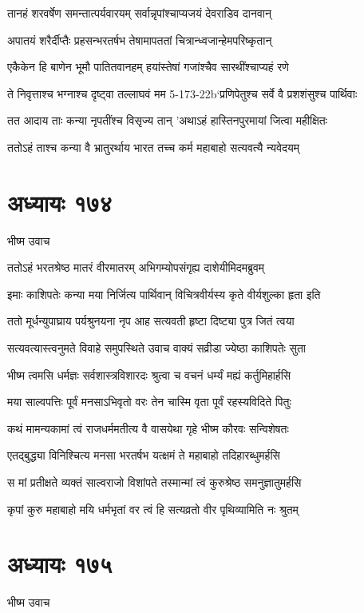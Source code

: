 \twolineshloka
{तानहं शरवर्षेण समन्तात्पर्यवारयम्}
{सर्वान्नृपांश्चाप्यजयं देवराडिव दानवान्}


\twolineshloka
{अपातयं शरैर्दीप्तैः प्रहसन्भरतर्षभ}
{तेषामापततां चित्रान्ध्वजान्हेमपरिष्कृतान्}


\twolineshloka
{एकैकेन हि बाणेन भूमौ पातितवानहम्}
{हयांस्तेषां गजांश्चैव सारथींश्चाप्यहं रणे}


\twolineshloka
{ते निवृत्ताश्च भग्नाश्च दृष्ट्वा तल्लाघवं मम}
{5-173-22b`प्रणिपेतुश्च सर्वे वै प्रशशंसुश्च पार्थिवाः}


\twolineshloka
{तत आदाय ताः कन्या नृपतींश्च विसृज्य तान्}
{'अथाऽहं हास्तिनपुरमायां जित्वा महीक्षितः}


\twolineshloka
{ततोऽहं ताश्च कन्या वै भ्रातुरर्थाय भारत}
{तच्च कर्म महाबाहो सत्यवत्यै न्यवेदयम्}


\chapter{अध्यायः १७४}
\twolineshloka
{भीष्म उवाच}
{}


\twolineshloka
{ततोऽहं भरतश्रेष्ठ मातरं वीरमातरम्}
{अभिगम्योपसंगृह्य दाशेयीमिदमब्रुवम्}


\twolineshloka
{इमाः काशिपतेः कन्या मया निर्जित्य पार्थिवान्}
{विचित्रवीर्यस्य कृते वीर्यशुल्का हृता इति}


\twolineshloka
{ततो मूर्धन्युपाघ्राय पर्यश्रुनयना नृप}
{आह सत्यवती हृष्टा दिष्ट्या पुत्र जितं त्वया}


\twolineshloka
{सत्यवत्यास्त्वनुमते विवाहे समुपस्थिते}
{उवाच वाक्यं सव्रीडा ज्येष्ठा काशिपतेः सुता}


\twolineshloka
{भीष्म त्वमसि धर्मज्ञः सर्वशास्त्रविशारदः}
{श्रुत्वा च वचनं धर्म्यं मह्यं कर्तुमिहार्हसि}


\twolineshloka
{मया साल्वपत्तिः पूर्वं मनसाऽभिवृतो वरः}
{तेन चास्मि वृता पूर्वं रहस्यविदिते पितुः}


\twolineshloka
{कथं मामन्यकामां त्वं राजधर्ममतीत्य वै}
{वासयेथा गृहे भीष्म कौरवः सन्विशेषतः}


\twolineshloka
{एतद्बुद्ध्या विनिश्चित्य मनसा भरतर्षभ}
{यत्क्षमं ते महाबाहो तदिहारब्धुमर्हसि}


\twolineshloka
{स मां प्रतीक्षते व्यक्तं साल्वराजो विशांपते}
{तस्मान्मां त्वं कुरुश्रेष्ठ समनुज्ञातुमर्हसि}


\twolineshloka
{कृपां कुरु महाबाहो मयि धर्मभृतां वर}
{त्वं हि सत्यव्रतो वीर पृथिव्यामिति नः श्रुतम्}


\chapter{अध्यायः १७५}
\twolineshloka
{भीष्म उवाच}
{}


